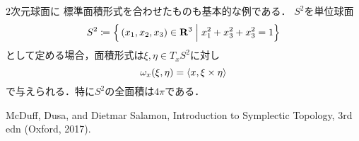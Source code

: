\begin{leftbar}
    \begin{EG}
        \(2\)次元球面に
        標準面積形式を合わせたものも基本的な例である．
        \(S^2\)を単位球面
        \[
            S^2\coloneqq\Big{\{}
                \left(x_1,x_2,x_3\right)\in\mathbf{R}^3
            \mathrel{\Big{|}} x_1^2+x_3^2+x_3^2=1\Big{\}}
        \]として定める場合，面積形式は\(\xi,\eta\in T_x S^2\)に対し
        \[
            \omega_x(\xi,\eta)=\inner<x,\xi\times\eta>
        \]で与えられる．特に\(S^2\)の全面積は\(4\pi\)である．
    \end{EG}
\end{leftbar}
\begin{thebibliography}{20} 
     McDuff, Dusa, 
    and Dietmar Salamon, 
    Introduction to Symplectic Topology, 
    3rd edn (Oxford, 2017).
\end{thebibliography}




